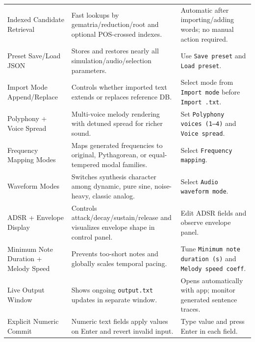 \documentclass[11pt,a4paper]{report}
\begin{document}
\begin{longtable}{>{\raggedright\arraybackslash}p{} >{\raggedright\arraybackslash}p{} >{\raggedright\arraybackslash}p{}}
Indexed Candidate Retrieval & Fast lookups by gematria/reduction/root and optional POS-crossed indexes. & Automatic after importing/adding words; no manual action required. \\

Preset Save/Load JSON & Stores and restores nearly all simulation/audio/selection parameters. & Use \texttt{Save preset} and \texttt{Load preset}. \\

Import Mode Append/Replace & Controls whether imported text extends or replaces reference DB. & Select mode from \texttt{Import mode} before \texttt{Import .txt}. \\

Polyphony + Voice Spread & Multi-voice melody rendering with detuned spread for richer sound. & Set \texttt{Polyphony voices (1--4)} and \texttt{Voice spread}. \\

Frequency Mapping Modes & Maps generated frequencies to original, Pythagorean, or equal-tempered modal families. & Select \texttt{Frequency mapping}. \\

Waveform Modes & Switches synthesis character among dynamic, pure sine, noise-heavy, classic analog. & Select \texttt{Audio waveform mode}. \\

ADSR + Envelope Display & Controls attack/decay/sustain/release and visualizes envelope shape in control panel. & Edit ADSR fields and observe envelope panel. \\

Minimum Note Duration + Melody Speed & Prevents too-short notes and globally scales temporal pacing. & Tune \texttt{Minimum note duration (s)} and \texttt{Melody speed coeff}. \\

Live Output Window & Shows ongoing \texttt{output.txt} updates in separate window. & Opens automatically with app; monitor generated sentence traces. \\

Explicit Numeric Commit & Numeric text fields apply values on Enter and revert invalid input. & Type value and press Enter in each field. \\

\bottomrule
\end{longtable}
\end{document}
